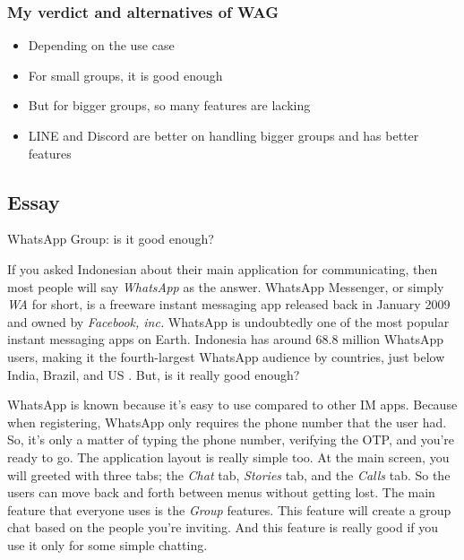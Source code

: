 \documentclass[
  12pt,
  answers  
]{exam}
\begin{document}
    \subsubsection{My verdict and alternatives of WAG}
    \begin{itemize}
        \item Depending on the use case
        \item For small groups, it is good enough
        \item But for bigger groups, so many features are lacking
        \item LINE and Discord are better on handling bigger groups and has better features
    \end{itemize}
    \pagebreak
    \subsection{Essay}
    \begin{centering}
        \Large{WhatsApp Group: is it good enough?} \par
        \vspace{10pt}
    \end{centering}

    If you asked Indonesian about their main application for communicating, then most people will say \emph{WhatsApp} as the answer. WhatsApp Messenger, or simply \emph{WA} for short, is a freeware instant messaging app released back in January 2009 and owned by \emph{Facebook, inc.} WhatsApp is undoubtedly one of the most popular instant messaging apps on Earth. Indonesia has around 68.8 million WhatsApp users, making it the fourth-largest WhatsApp audience by countries, just below India, Brazil, and US \cite{deanWhatsApp2021User2021}. But, is it really good enough?

    WhatsApp is known because it's easy to use compared to other IM apps. Because when registering, WhatsApp only requires the phone number that the user had. So, it's only a matter of typing the phone number, verifying the OTP, and you're ready to go. The application layout is really simple too. At the main screen, you will greeted with three tabs; the \emph{Chat} tab, \emph{Stories} tab, and the \emph{Calls} tab. So the users can move back and forth between menus without getting lost. The main feature that everyone uses is the \emph{Group} features. This feature will create a group chat based on the people you're inviting. And this feature is really good if you use it only for some simple chatting.
\end{document}
